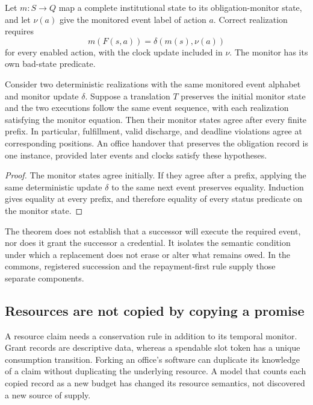 Let $m:S\to Q$ map a complete institutional state to its obligation-monitor state, and let $\nu(a)$ give the monitored event label of action $a$. Correct realization requires
\[
m(F(s,a))=\delta(m(s),\nu(a))
\]
for every enabled action, with the clock update included in $\nu$. The monitor has its own bad-state predicate.

\begin{MSproposition}\label{MS:prop:obligationtransport}
Consider two deterministic realizations with the same monitored event alphabet and monitor update $\delta$. Suppose a translation $T$ preserves the initial monitor state and the two executions follow the same event sequence, with each realization satisfying the monitor equation. Then their monitor states agree after every finite prefix. In particular, fulfillment, valid discharge, and deadline violations agree at corresponding positions. An office handover that preserves the obligation record is one instance, provided later events and clocks satisfy these hypotheses.
\end{MSproposition}
\begin{proof}
The monitor states agree initially. If they agree after a prefix, applying the same deterministic update $\delta$ to the same next event preserves equality. Induction gives equality at every prefix, and therefore equality of every status predicate on the monitor state.
\end{proof}

The theorem does not establish that a successor will execute the required event, nor does it grant the successor a credential. It isolates the semantic condition under which a replacement does not erase or alter what remains owed. In the commons, registered succession and the repayment-first rule supply those separate components.

\subsection{Resources are not copied by copying a promise}
A resource claim needs a conservation rule in addition to its temporal monitor. Grant records are descriptive data, whereas a spendable slot token has a unique consumption transition. Forking an office's software can duplicate its knowledge of a claim without duplicating the underlying resource. A model that counts each copied record as a new budget has changed its resource semantics, not discovered a new source of supply.

